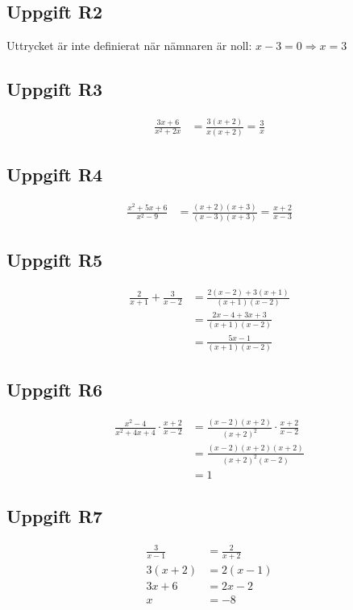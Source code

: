 \documentclass[12pt]{article}
\begin{document}
\subsection*{Uppgift R2}
Uttrycket är inte definierat när nämnaren är noll: $x - 3 = 0 \Rightarrow x = 3$

\subsection*{Uppgift R3}
\begin{align*}
\frac{3x + 6}{x^2 + 2x} &= \frac{3(x + 2)}{x(x + 2)} = \frac{3}{x}
\end{align*}

\subsection*{Uppgift R4}
\begin{align*}
\frac{x^2 + 5x + 6}{x^2 - 9} &= \frac{(x + 2)(x + 3)}{(x - 3)(x + 3)} = \frac{x + 2}{x - 3}
\end{align*}

\subsection*{Uppgift R5}
\begin{align*}
\frac{2}{x + 1} + \frac{3}{x - 2} &= \frac{2(x - 2) + 3(x + 1)}{(x + 1)(x - 2)} \\
&= \frac{2x - 4 + 3x + 3}{(x + 1)(x - 2)} \\
&= \frac{5x - 1}{(x + 1)(x - 2)}
\end{align*}

\subsection*{Uppgift R6}
\begin{align*}
\frac{x^2 - 4}{x^2 + 4x + 4} \cdot \frac{x + 2}{x - 2} &= \frac{(x - 2)(x + 2)}{(x + 2)^2} \cdot \frac{x + 2}{x - 2} \\
&= \frac{(x - 2)(x + 2)(x + 2)}{(x + 2)^2(x - 2)} \\
&= 1
\end{align*}

\subsection*{Uppgift R7}
\begin{align*}
\frac{3}{x - 1} &= \frac{2}{x + 2} \\
3(x + 2) &= 2(x - 1) \\
3x + 6 &= 2x - 2 \\
x &= -8
\end{align*}
\end{document}
